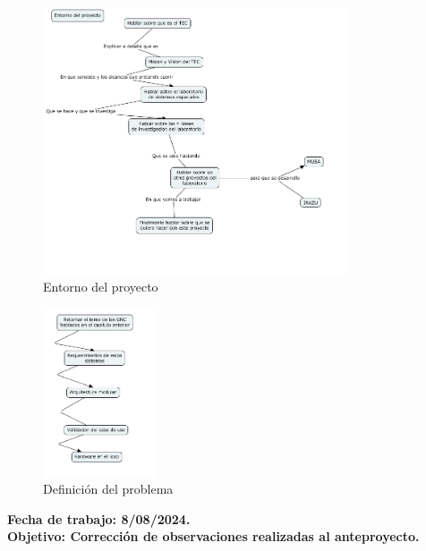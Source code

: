 \documentclass[12pt,letterpaper]{article}
\begin{document}
\begin{table}[h!]
{\begin{tabular}{|l|}
    
    \end{tabular}%
    }
    \end{table}

    \begin{figure}[h!]
        \centering
        \includegraphics[width=0.8\textwidth]{Mapas conceptuales por seccion del anteproyecto/Diagrama_Entorno_del proyecto.png}
        \caption{Entorno del proyecto}
        \label{fig:Entorno}
      \end{figure}
      \newpage

      \begin{figure}[h!]
        \centering
        \includegraphics[width=0.3\textwidth]{Mapas conceptuales por seccion del anteproyecto/Diagrama_Entorno.png}
        \caption{Definición del problema}
        \label{fig:definicion}
      \end{figure}


      \bf{Fecha de trabajo:} 8/08/2024.\\
      \bf{Objetivo:} Corrección de observaciones realizadas al anteproyecto.
\end{document}
